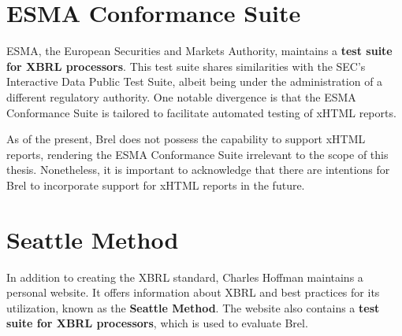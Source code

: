 \section{ESMA Conformance Suite}

ESMA, the European Securities and Markets Authority, 
maintains a 
\textcolor{turkishrose}{\textbf{test suite for XBRL processors}}\cite{esma_conformance_suite}.
This test suite shares similarities with the SEC's Interactive Data Public Test Suite, albeit being under the administration of a different regulatory authority. 
One notable divergence is that the ESMA Conformance Suite is tailored to facilitate automated testing of xHTML reports.

As of the present, Brel does not possess the capability to support xHTML reports, 
rendering the ESMA Conformance Suite irrelevant to the scope of this thesis. 
Nonetheless, it is important to acknowledge that there are intentions for Brel to incorporate support for xHTML reports in the future.

\section{Seattle Method}

In addition to creating the XBRL standard, Charles Hoffman maintains a personal website. 
It offers information about XBRL and best practices for its utilization, known as the \textcolor{airforceblue}{\textbf{Seattle Method}}\cite{seattle_method}.
The website also contains a
\textcolor{turkishrose}{\textbf{test suite for XBRL processors}}, which is used to evaluate Brel.


